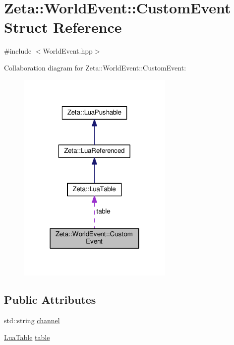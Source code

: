 \hypertarget{structZeta_1_1WorldEvent_1_1CustomEvent}{\section{Zeta\+:\+:World\+Event\+:\+:Custom\+Event Struct Reference}
\label{structZeta_1_1WorldEvent_1_1CustomEvent}
}


{\ttfamily \#include $<$World\+Event.\+hpp$>$}



Collaboration diagram for Zeta\+:\+:World\+Event\+:\+:Custom\+Event\+:\nopagebreak
\begin{figure}[H]
\begin{center}
\leavevmode
\includegraphics[width=214pt]{structZeta_1_1WorldEvent_1_1CustomEvent__coll__graph}
\end{center}
\end{figure}
\subsection*{Public Attributes}
\begin{DoxyCompactItemize}
\item 
std\+::string \hyperlink{structZeta_1_1WorldEvent_1_1CustomEvent_a2f563de54065ecc45d46ed7be7d251a1}{channel}
\item 
\hyperlink{classZeta_1_1LuaTable}{Lua\+Table} \hyperlink{structZeta_1_1WorldEvent_1_1CustomEvent_af364dcbc8aae84e80b6ea0b1f90eb1eb}{table}
\end{DoxyCompactItemize}


